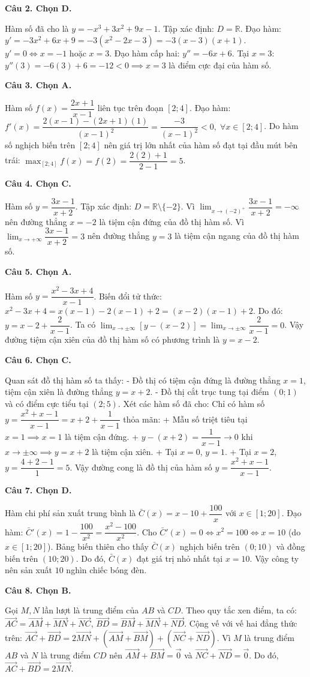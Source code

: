\documentclass[12pt,a4paper]{article}
\newcommand{\loigiai}[1]{\par\medskip\Needspace{4\baselineskip}\noindent\textbf{#1}\par\nobreak}
\begin{document}
\loigiai{Câu 2. Chọn D.}
Hàm số đã cho là $y=-x^3+3x^2+9x-1$.
Tập xác định: $D=\mathbb{R}$.
Đạo hàm: $y'=-3x^2+6x+9=-3(x^2-2x-3)=-3(x-3)(x+1)$.
$y'=0 \iff x=-1$ hoặc $x=3$.
Đạo hàm cấp hai: $y''=-6x+6$.
Tại $x=3$: $y''(3)=-6(3)+6=-12<0 \implies x=3$ là điểm cực đại của hàm số.

\loigiai{Câu 3. Chọn A.}
Hàm số $f(x)=\dfrac{2x+1}{x-1}$ liên tục trên đoạn $[2;4]$.
Đạo hàm: $f'(x)=\dfrac{2(x-1)-(2x+1)(1)}{(x-1)^2}=\dfrac{-3}{(x-1)^2}<0,\;\forall x\in[2;4]$.
Do hàm số nghịch biến trên $[2;4]$ nên giá trị lớn nhất của hàm số đạt tại đầu mút bên trái:
$\max_{[2;4]} f(x)=f(2)=\dfrac{2(2)+1}{2-1}=5$.

\loigiai{Câu 4. Chọn C.}
Hàm số $y=\dfrac{3x-1}{x+2}$.
Tập xác định: $D=\mathbb{R}\setminus\{-2\}$.
Vì $\lim_{x\to (-2)^+} \dfrac{3x-1}{x+2}=-\infty$ nên đường thẳng $x=-2$ là tiệm cận đứng của đồ thị hàm số.
Vì $\lim_{x\to +\infty} \dfrac{3x-1}{x+2}=3$ nên đường thẳng $y=3$ là tiệm cận ngang của đồ thị hàm số.

\loigiai{Câu 5. Chọn A.}
Hàm số $y=\dfrac{x^2-3x+4}{x-1}$.
Biến đổi tử thức: $x^2-3x+4 = x(x-1) - 2(x-1) + 2 = (x-2)(x-1)+2$.
Do đó: $y=x-2+\dfrac{2}{x-1}$.
Ta có $\lim_{x\to\pm\infty}[y-(x-2)]=\lim_{x\to\pm\infty}\dfrac{2}{x-1}=0$.
Vậy đường tiệm cận xiên của đồ thị hàm số có phương trình là $y=x-2$.

\loigiai{Câu 6. Chọn C.}
Quan sát đồ thị hàm số ta thấy:
- Đồ thị có tiệm cận đứng là đường thẳng $x=1$, tiệm cận xiên là đường thẳng $y=x+2$.
- Đồ thị cắt trục tung tại điểm $(0;1)$ và có điểm cực tiểu tại $(2;5)$.
Xét các hàm số đã cho:
Chỉ có hàm số $y=\dfrac{x^2+x-1}{x-1}=x+2+\dfrac{1}{x-1}$ thỏa mãn:
+ Mẫu số triệt tiêu tại $x=1 \implies x=1$ là tiệm cận đứng.
+ $y-(x+2)=\dfrac{1}{x-1}\to 0$ khi $x\to\pm\infty \implies y=x+2$ là tiệm cận xiên.
+ Tại $x=0$, $y=1$.
+ Tại $x=2$, $y=\dfrac{4+2-1}{1}=5$.
Vậy đường cong là đồ thị của hàm số $y=\dfrac{x^2+x-1}{x-1}$.

\loigiai{Câu 7. Chọn D.}
Hàm chi phí sản xuất trung bình là $\bar{C}(x)=x-10+\dfrac{100}{x}$ với $x\in[1;20]$.
Đạo hàm: $\bar{C}'(x)=1-\dfrac{100}{x^2}=\dfrac{x^2-100}{x^2}$.
Cho $\bar{C}'(x)=0 \iff x^2=100 \iff x=10$ (do $x\in[1;20]$).
Bảng biến thiên cho thấy $\bar{C}(x)$ nghịch biến trên $(0;10)$ và đồng biến trên $(10;20)$.
Do đó, $\bar{C}(x)$ đạt giá trị nhỏ nhất tại $x=10$.
Vậy công ty nên sản xuất $10$ nghìn chiếc bóng đèn.

\loigiai{Câu 8. Chọn B.}
Gọi $M, N$ lần lượt là trung điểm của $AB$ và $CD$.
Theo quy tắc xen điểm, ta có:
$\vec{AC}=\vec{AM}+\vec{MN}+\vec{NC}$,
$\vec{BD}=\vec{BM}+\vec{MN}+\vec{ND}$.
Cộng vế với vế hai đẳng thức trên:
$\vec{AC}+\vec{BD}=2\vec{MN}+(\vec{AM}+\vec{BM})+(\vec{NC}+\vec{ND})$.
Vì $M$ là trung điểm $AB$ và $N$ là trung điểm $CD$ nên $\vec{AM}+\vec{BM}=\vec{0}$ và $\vec{NC}+\vec{ND}=\vec{0}$.
Do đó, $\vec{AC}+\vec{BD}=2\vec{MN}$.
\end{document}
